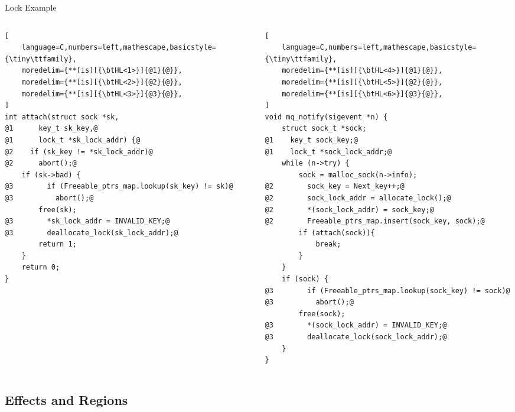 \documentclass[aspectratio=169]{beamer}
\begin{document}
\begin{frame}[fragile]{Lock Example}

\begin{columns}[T]
\begin{column}{0.48\textwidth}
\begin{lstlisting}[
    language=C,numbers=left,mathescape,basicstyle={\tiny\ttfamily},
    moredelim={**[is][{\btHL<1>}]{@1}{@}},
    moredelim={**[is][{\btHL<2>}]{@2}{@}},
    moredelim={**[is][{\btHL<3>}]{@3}{@}},
]
int attach(struct sock *sk,
@1      key_t sk_key,@
@1      lock_t *sk_lock_addr) {@
@2    if (sk_key != *sk_lock_addr)@
@2      abort();@
    if (sk->bad) {
@3        if (Freeable_ptrs_map.lookup(sk_key) != sk)@
@3          abort();@
        free(sk);
@3        *sk_lock_addr = INVALID_KEY;@
@3        deallocate_lock(sk_lock_addr);@
        return 1;
    }
    return 0;
}
\end{lstlisting}
\end{column}
\begin{column}{0.50\textwidth}
\begin{lstlisting}[
    language=C,numbers=left,mathescape,basicstyle={\tiny\ttfamily},
    moredelim={**[is][{\btHL<4>}]{@1}{@}},
    moredelim={**[is][{\btHL<5>}]{@2}{@}},
    moredelim={**[is][{\btHL<6>}]{@3}{@}},
]
void mq_notify(sigevent *n) {
    struct sock_t *sock;
@1    key_t sock_key;@
@1    lock_t *sock_lock_addr;@
    while (n->try) {
        sock = malloc_sock(n->info);
@2        sock_key = Next_key++;@
@2        sock_lock_addr = allocate_lock();@
@2        *(sock_lock_addr) = sock_key;@
@2        Freeable_ptrs_map.insert(sock_key, sock);@
        if (attach(sock)){
            break;
        }
    }
    if (sock) {
@3        if (Freeable_ptrs_map.lookup(sock_key) != sock)@
@3          abort();@
        free(sock);
@3        *(sock_lock_addr) = INVALID_KEY;@
@3        deallocate_lock(sock_lock_addr);@
    }
}
\end{lstlisting}
\end{column}
\end{columns}
\end{frame}

\subsection{Effects and Regions}

\end{document}

